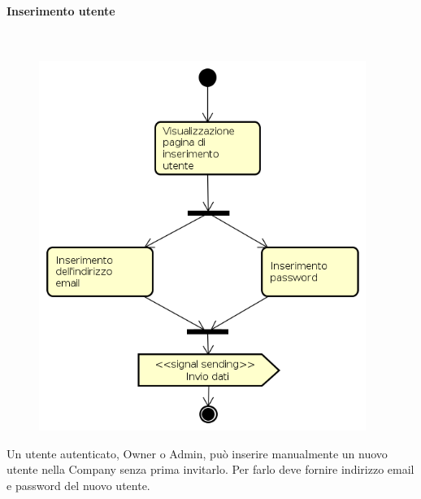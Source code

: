 \paragraph{Inserimento utente} \mbox{} \\
\begin{figure}[H]
\begin{center}
\includegraphics[height=12cm]{res/sections/backend/activities/inserimentoUtente.png}
\end{center}
\end{figure}
Un utente autenticato, Owner o Admin, può inserire manualmente un nuovo utente nella Company senza prima invitarlo. Per farlo deve fornire indirizzo email e password del nuovo utente.
